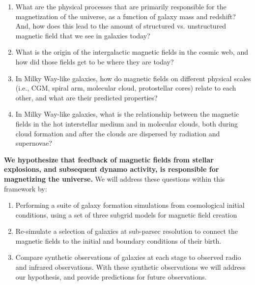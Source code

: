 \vspace{-2mm}
\begin{enumerate}

\item What are the physical processes that are primarily responsible for the
magnetization of the universe, as a function of galaxy mass and
redshift?  And, how does this lead to the amount of structured
vs. unstructured magnetic field that we see in galaxies today?

\item What is the origin of the intergalactic magnetic fields in the
  cosmic web, and how did those fields get to be where they are today?

\item In Milky Way-like galaxies, how do magnetic fields on different
  physical scales (i.e., CGM, spiral arm, molecular cloud,
  protostellar cores) relate to each other, and what are their
  predicted properties?

\item In Milky Way-like galaxies, what is the relationship between the
  magnetic fields in the hot interstellar medium and in molecular
  clouds, both during cloud formation and after the clouds are
  dispersed by radiation and supernovae?

\end{enumerate}
\vspace{-2mm}

\textbf{We hypothesize that feedback of magnetic fields from
stellar explosions, and subsequent dynamo activity, is responsible for
magnetizing the universe.}  We will address these questions within this
framework by:
\vspace{-2mm}
\begin{enumerate}

\item Performing a suite of galaxy formation simulations from cosmological
initial conditions, using a set of three subgrid models for magnetic field
creation
\item Re-simulate a selection of galaxies at sub-parsec resolution to connect the
magnetic fields to the initial and boundary conditions of their birth.

\item Compare synthetic observations of galaxies at each stage to observed radio
and infrared observations.  With these synthetic observations we will address
our hypothesis, and provide predictions for future observations.


\end{enumerate}
\vspace{-2mm}

